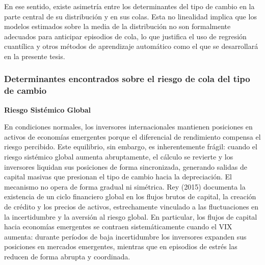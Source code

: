 ﻿\documentclass[11pt,a4paper]{article}
\begin{document}


En ese sentido, existe asimetría entre los determinantes del tipo de cambio en la parte central de su distribución y en sus colas. Esta no linealidad implica que los modelos estimados sobre la media de la distribución no son formalmente adecuados para anticipar episodios de cola, lo que justifica el uso de regresión cuantílica y otros métodos de aprendizaje automático como el que se desarrollará en la presente tesis.  

\subsubsection{Determinantes encontrados sobre el riesgo de cola del tipo de cambio}

\textbf{Riesgo Sistémico Global}

En condiciones normales, los inversores internacionales mantienen posiciones en activos de economías emergentes porque el diferencial de rendimiento compensa el riesgo percibido. Este equilibrio, sin embargo, es inherentemente frágil: cuando el riesgo sistémico global aumenta abruptamente, el cálculo se revierte y los inversores liquidan sus posiciones de forma sincronizada, generando salidas de capital masivas que presionan el tipo de cambio hacia la depreciación. El mecanismo no opera de forma gradual ni simétrica. Rey (2015) documenta la existencia de un ciclo financiero global en los flujos brutos de capital, la creación de crédito y los precios de activos, estrechamente vinculado a las fluctuaciones en la incertidumbre y la aversión al riesgo global. En particular, los flujos de capital hacia economías emergentes se contraen sistemáticamente cuando el VIX aumenta: durante períodos de baja incertidumbre los inversores expanden sus posiciones en mercados emergentes, mientras que en episodios de estrés las reducen de forma abrupta y coordinada.
\end{document}
